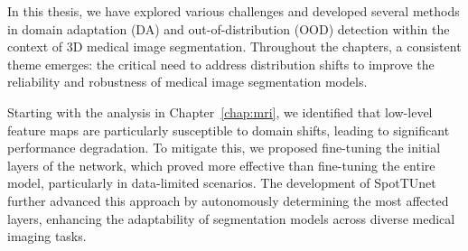 






In this thesis, we have explored various challenges and developed several methods in domain adaptation (DA) and out-of-distribution (OOD) detection within the context of 3D medical image segmentation. Throughout the chapters, a consistent theme emerges: the critical need to address distribution shifts to improve the reliability and robustness of medical image segmentation models.

Starting with the analysis in Chapter~\ref{chap:mri}, we identified that low-level feature maps are particularly susceptible to domain shifts, leading to significant performance degradation. To mitigate this, we proposed fine-tuning the initial layers of the network, which proved more effective than fine-tuning the entire model, particularly in data-limited scenarios. The development of SpotTUnet further advanced this approach by autonomously determining the most affected layers, enhancing the adaptability of segmentation models across diverse medical imaging tasks.

